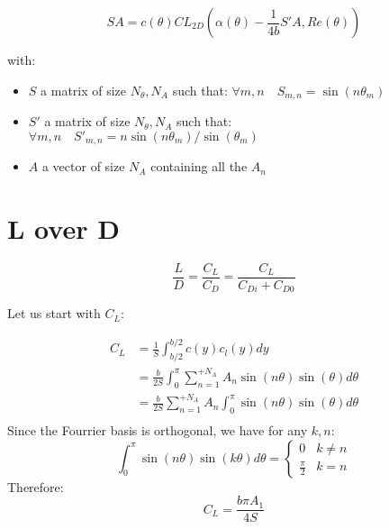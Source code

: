 \documentclass[letterpaper,12pt]{article}
\begin{document}
\begin{equation}
	SA = c(\theta) CL_{2D} \left( \alpha(\theta) - \frac {1}{4b} S' A , Re(\theta)\right) 
\end{equation}

with:
\begin{itemize}
	\item[] $S$ a matrix of size $N_{\theta}, N_A$ such that: $ \forall m,n \quad S_{m,n} = \sin(n\theta_m)$ 
	\item[] $S'$ a matrix of size $N_{\theta}, N_A$ such that: $ \forall m,n \quad {S'}_{m,n} = n\sin(n\theta_m)/\sin(\theta_m)$ 
	\item[] $A$ a vector of size $N_A$ containing all the $A_n$
\end{itemize}


\section{L over D}

\begin{equation*}
	\frac L D = \frac{C_L}{C_D} = \frac {C_L} {C_{Di} + C_{D0}} 
\end{equation*}

Let us start with $C_L$:

\begin{align}
	C_L &= \frac 1 S \int_{b/2}^{b/2} c(y) c_l(y) dy  \nonumber \\
		&= \frac b {2S} \int_{0}^{\pi} \sum_{n=1}^{+N_A} A_n \sin(n\theta) \sin(\theta)d\theta \nonumber \\
		&= \frac b {2S}  \sum_{n=1}^{+N_A} A_n \int_{0}^{\pi} \sin(n\theta) \sin(\theta)d\theta \nonumber \\
\end{align}
Since the Fourrier basis is orthogonal, we have for any $k, n$:
\begin{equation*}
	\int_0^{\pi} \sin(n\theta)\sin(k\theta)d\theta = 
	\begin{cases} 
		0 & k \neq n \\
		\frac{\pi}{2} & k = n
	 \end{cases}
\end{equation*}
Therefore:
\begin{equation}
	\label{eq:cl}
	C_L = \frac{b \pi A_1}{4S}
\end{equation}
\end{document}
